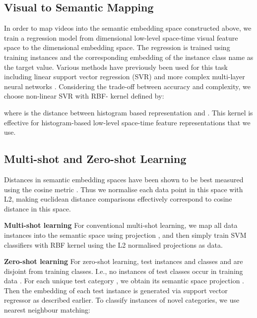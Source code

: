 \documentclass{article}
\begin{document}
\subsection{Visual to Semantic Mapping}\label{subsec:regression}

In order to map videos into the semantic embedding space constructed above, we train a regression model  from  dimensional low-level space-time visual feature space to the  dimensional embedding space. The regression is trained using training instances  and the corresponding embedding  of the instance class name  as the target value. Various methods have previously been used for this task including linear support vector regression (SVR) \cite{Fu2014a} and more complex multi-layer neural networks \cite{Socher2013}. Considering the trade-off between accuracy and complexity, we choose non-linear SVR with RBF- kernel defined by:



\noindent where  is the  distance between histogram based representation  and  \cite{Laptev2008}. This kernel is effective for histogram-based low-level space-time feature representations \cite{Wang2013} that we  use. 

\subsection{Multi-shot and Zero-shot Learning}\label{sect:MulZeroLearning}
Distances in semantic embedding spaces have been shown to be best measured using the cosine metric  \cite{Mikolov2013,Fu2014a}. Thus we normalise each data point in this space with L2, making euclidean distance comparisons effectively correspond to cosine distance  in this space.

\noindent\textbf{Multi-shot learning}\quad
For conventional multi-shot learning, we map all data instances  into the semantic space using projection , and then simply train SVM classifiers with RBF kernel using the L2 normalised projections  as data.

\noindent\textbf{Zero-shot learning}\quad
For zero-shot learning, test instances and classes  and  are disjoint from training classes. I.e., no instances of test classes  occur in training data . For each unique test category , we obtain its semantic space projection . Then the embedding  of each test instance  is generated via support vector regressor  as described earlier. To classify instances  of novel categories, we use nearest neighbour matching:
\end{document}
